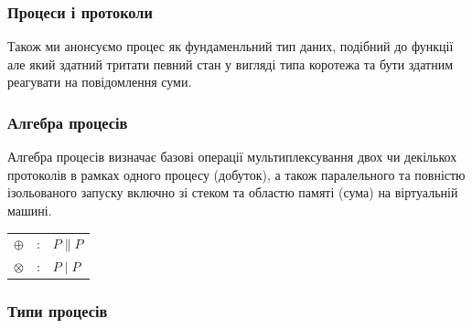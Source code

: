 \documentclass[11pt,oneside]{article}
\begin{document}
  \subsubsection*{Процеси і протоколи}

Також ми анонсуємо процес як фундаменльний тип даних, подібний до функції але який здатний
тритати певний стан у вигляді типа коротежа та бути здатним реагувати на повідомлення суми.

\begin{prooftree}
\end{prooftree}

\begin{prooftree}
\end{prooftree}

\begin{prooftree}
\end{prooftree}

  \subsubsection*{Алгебра процесів}

  Алгебра процесів визначає базові операції мультиплексування двох чи декількох
  протоколів в рамках одного процесу (добуток), а також паралельного та повністю
  ізольованого запуску включно зі стеком та областю памяті (сума) на
  віртуальній машині.

\begin{center}
\begin{tabular}{lcl}
$\oplus$   &:& $P \parallel P$\\
$\otimes$  &:& $P \mid P$\\
\end{tabular}
\end{center}

  \subsubsection*{Типи процесів}
\end{document}
